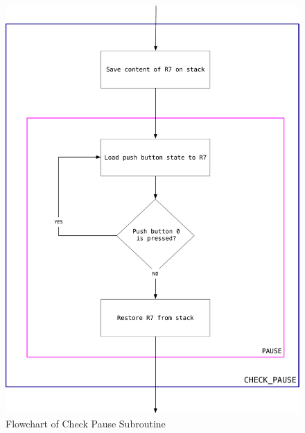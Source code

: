 \documentclass[titlepage]{article}
\begin{document}
	\begin{figure}[h]
		\centering
		\includegraphics[scale=.45]{../images/check_pause.pdf}
		\caption{Flowchart of Check Pause Subroutine}
	\end{figure}
\end{document}
